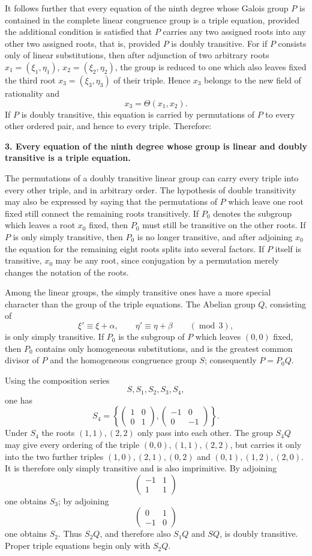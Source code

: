 \documentclass[11pt]{article}
\providecommand{\mat}[4]{\begin{pmatrix}#1&#2\\#3&#4\end{pmatrix}}
\providecommand{\mat}[4]{\begin{pmatrix}#1&#2\\#3&#4\end{pmatrix}}
\begin{document}
It follows further that every equation of the ninth degree whose Galois group \(P\) is contained in the complete linear congruence group is a triple equation, provided the additional condition is satisfied that \(P\) carries any two assigned roots into any other two assigned roots, that is, provided \(P\) is doubly transitive. For if \(P\) consists only of linear substitutions, then after adjunction of two arbitrary roots \(x_1=(\xi_1,\eta_1)\), \(x_2=(\xi_2,\eta_2)\), the group is reduced to one which also leaves fixed the third root \(x_3=(\xi_3,\eta_3)\) of their triple. Hence \(x_3\) belongs to the new field of rationality and
\begin{equation}
 x_3=\Theta(x_1,x_2).
 \tag{8}
\end{equation}
If \(P\) is doubly transitive, this equation is carried by permutations of \(P\) to every other ordered pair, and hence to every triple. Therefore:

\textbf{3. Every equation of the ninth degree whose group is linear and doubly transitive is a triple equation.}

The permutations of a doubly transitive linear group can carry every triple into every other triple, and in arbitrary order. The hypothesis of double transitivity may also be expressed by saying that the permutations of \(P\) which leave one root fixed still connect the remaining roots transitively. If \(P_0\) denotes the subgroup which leaves a root \(x_0\) fixed, then \(P_0\) must still be transitive on the other roots. If \(P\) is only simply transitive, then \(P_0\) is no longer transitive, and after adjoining \(x_0\) the equation for the remaining eight roots splits into several factors. If \(P\) itself is transitive, \(x_0\) may be any root, since conjugation by a permutation merely changes the notation of the roots.

Among the linear groups, the simply transitive ones have a more special character than the group of the triple equations. The Abelian group \(Q\), consisting of
\begin{equation}
 \xi'\equiv \xi+\alpha,
 \qquad
 \eta'\equiv \eta+\beta
 \qquad(\operatorname{mod}\,3),
 \tag{9}
\end{equation}
is only simply transitive. If \(P_0\) is the subgroup of \(P\) which leaves \((0,0)\) fixed, then \(P_0\) contains only homogeneous substitutions, and is the greatest common divisor of \(P\) and the homogeneous congruence group \(S\); consequently \(P=P_0Q\).

Using the composition series
\[
 S,
 S_1,
 S_2,
 S_3,
 S_4,
\]
one has
\[
 S_4=\left\{
 \mat{1}{0}{0}{1},
 \mat{-1}{0}{0}{-1}
 \right\}.
\]
Under \(S_4\) the roots \((1,1),(2,2)\) only pass into each other. The group \(S_4Q\) may give every ordering of the triple \((0,0),(1,1),(2,2)\), but carries it only into the two further triples \((1,0),(2,1),(0,2)\) and \((0,1),(1,2),(2,0)\). It is therefore only simply transitive and is also imprimitive. By adjoining
\[
 \mat{-1}{1}{1}{1}
\]
one obtains \(S_3\); by adjoining
\[
 \mat{0}{1}{-1}{0}
\]
one obtains \(S_2\). Thus \(S_2Q\), and therefore also \(S_1Q\) and \(SQ\), is doubly transitive. Proper triple equations begin only with \(S_2Q\).
\end{document}

